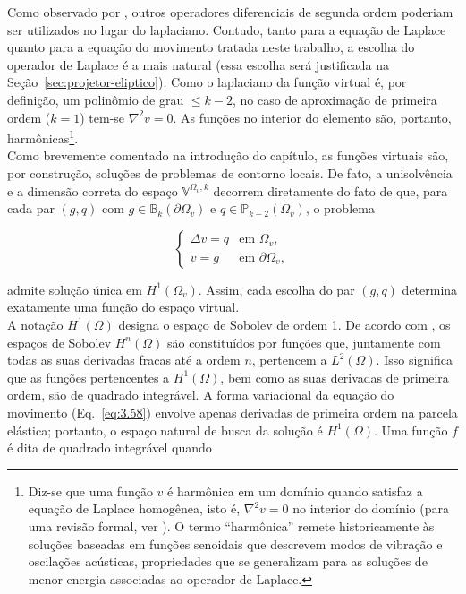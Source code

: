     \indent Como observado por \citet{basicprinciplesvirtualelementmethods2013a}, outros operadores diferenciais de segunda ordem poderiam ser utilizados no lugar do laplaciano. Contudo, tanto para a equação de Laplace quanto para a equação do movimento tratada neste trabalho, a escolha do operador de Laplace é a mais natural (essa escolha será justificada na Seção~\ref{sec:projetor-eliptico}). Como o laplaciano da função virtual é, por definição, um polinômio de grau $\le k-2$, no caso de aproximação de primeira ordem ($k=1$) tem-se $\nabla^2 v = 0$. As funções no interior do elemento são, portanto, harmônicas\footnote{Diz-se que uma função $v$ é harmônica em um domínio quando satisfaz a equação de Laplace homogênea, isto é, $\nabla^2 v = 0$ no interior do domínio (para uma revisão formal, ver \citet[Capítulo~2]{evans2010partial}). O termo ``harmônica'' remete historicamente às soluções baseadas em funções senoidais que descrevem modos de vibração e oscilações acústicas, propriedades que se generalizam para as soluções de menor energia associadas ao operador de Laplace.}.\\
    \indent Como brevemente comentado na introdução do capítulo, as funções virtuais são, por construção, soluções de problemas de contorno locais. De fato, a unisolvência e a dimensão correta do espaço $\mathbb{V}^{\Omega_v,k}$ decorrem diretamente do fato de que, para cada par $(g,q)$ com $g\in\mathbb{B}_k(\partial \Omega_v)$ e $q\in\mathbb{P}_{k-2}(\Omega_v)$, o problema

    \begin{equation*}
        \begin{cases}
            \Delta v = q & \text{em }\Omega_v,\\
            v = g & \text{em }\partial \Omega_v,
        \end{cases}
    \end{equation*}

    \noindent admite solução única em $H^1(\Omega_v)$. Assim, cada escolha do par $(g,q)$ determina exatamente uma função do espaço virtual.\\
    \indent A notação \(H^1(\Omega)\) designa o espaço de Sobolev de ordem 1. De acordo com \citet{hughes1987finite}, os espaços de Sobolev \(H^n(\Omega)\) são constituídos por funções que, juntamente com todas as suas derivadas fracas até a ordem \(n\), pertencem a \(L^2(\Omega)\). Isso significa que as funções pertencentes a \(H^1(\Omega)\), bem como as suas derivadas de primeira ordem, são de quadrado integrável. A forma variacional da equação do movimento (Eq.~\ref{eq:3.58}) envolve apenas derivadas de primeira ordem na parcela elástica; portanto, o espaço natural de busca da solução é \(H^1(\Omega)\). Uma função \(f\) é dita de quadrado integrável quando

